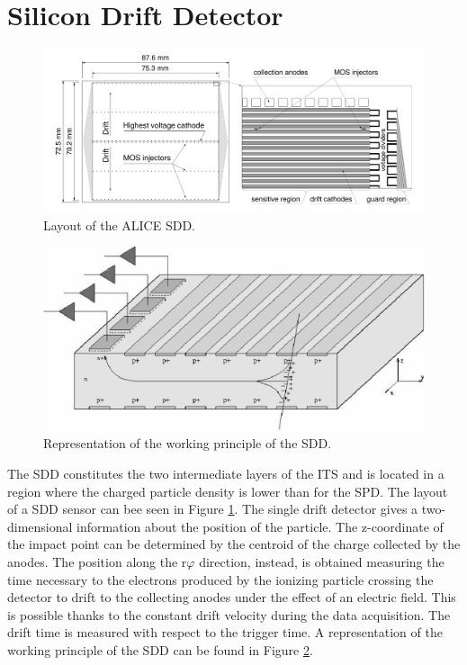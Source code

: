 \section{Silicon Drift Detector}
\begin{figure}
  \centering
  \includegraphics[scale=0.30]{figures/SDD.png}
  \caption{Layout of the ALICE SDD.}
  \label{fig:SDD}
\end{figure}
%
\begin{figure}
  \centering
  \includegraphics[scale=0.25]{figures/sddw.png}
  \caption{Representation of the working principle of the SDD.}
  \label{fig:sddw}
\end{figure}
%
The SDD constitutes the two intermediate layers of the ITS and is located in a region where the charged particle density is lower than for the SPD. The layout of a SDD sensor can bee seen in Figure \ref{fig:SDD}. The single drift detector gives a two-dimensional information about the position of the particle. The z-coordinate of the impact point can be determined by the centroid of the charge collected by the anodes. The position along the r$\varphi$ direction, instead, is obtained measuring the time necessary to the electrons produced by the ionizing particle crossing the detector to drift to the collecting anodes under the effect of an electric field. This is possible thanks to the constant drift velocity during the data acquisition. The drift time is measured with respect to the trigger time. A representation of the working principle of the SDD can be found in Figure \ref{fig:sddw}.\\
